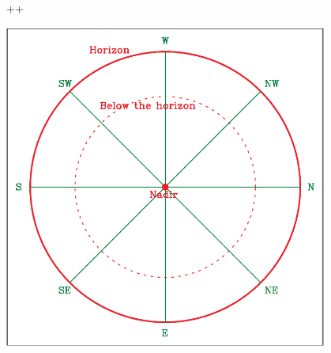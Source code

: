 ++\documentclass[12pt]{article}
\begin{document}
\begin{enumerate}
\begin{center}
\begin{minipage}{0.4\textwidth}
\begin{center}
					\includegraphics[width=0.8\textwidth]{botsky-crop.pdf}
				\end{center}
			\end{minipage}
		\end{center}
		
	\end{enumerate}
	
	
		
		
		
	
\end{document}
